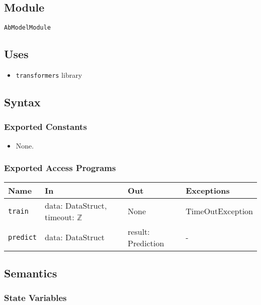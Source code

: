 \documentclass[12pt, titlepage]{article}
\begin{document}
\subsection{Module}

\texttt{AbModelModule}

\subsection{Uses}

\begin{itemize}
    \item \texttt{transformers} library
\end{itemize}

\subsection{Syntax}

\subsubsection{Exported Constants}

\begin{itemize}
    \item None.
\end{itemize}

\subsubsection{Exported Access Programs}

\begin{center}
\begin{tabular}{p{5cm} p{3.5cm} p{3.5cm} p{2cm}}
\hline
\textbf{Name} & \textbf{In} & \textbf{Out} & \textbf{Exceptions} \\
\hline
\texttt{train} & data: DataStruct, timeout: $\mathbb{Z}$  & None & TimeOutException \\
\texttt{predict} & data: DataStruct & result: Prediction & - \\
\hline
\end{tabular}
\end{center}

\subsection{Semantics}

\subsubsection{State Variables}
\end{document}
